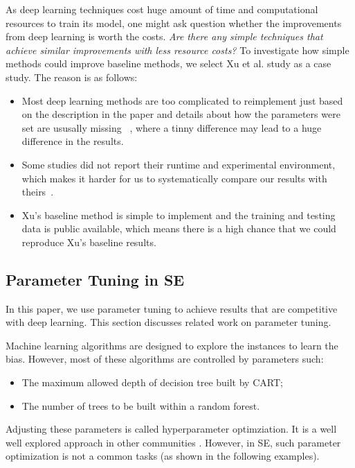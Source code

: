 \documentclass[sigconf,review, anonymous]{acmart}
\theoremstyle{break}
\newcommand{\bi}{\begin{itemize}[leftmargin=0.4cm]}
\newcommand{\ei}{\end{itemize}}
\begin{document}
As deep learning techniques cost huge amount of time and computational
resources to train its model,
one might ask question whether the improvements from deep learning is worth
the costs. {\it Are there any simple techniques that achieve similar improvements
with less resource costs?} To investigate how simple methods could improve baseline
methods, we select Xu et al.\cite{xu2016predicting} study as a case study. The reason
is as follows:
\bi 
\item Most deep learning methods are too complicated to reimplement just based on the description
in the paper and details about how the parameters were set are ususally missing ~\cite{white2016deep,white2015toward,lam2015combining,wang2016automatically,choetkiertikul2016deep,gu2016deep}, where a tinny difference may lead to a huge difference in the results.
\item Some studies did not report their runtime and experimental environment, which makes it harder for us
to systematically compare our results with theirs~\cite{choetkiertikul2016deep,yuan2014droid,white2015toward, white2016deep}.
\item Xu's baseline method is simple to implement and the training and testing data is public available, which means there is a high chance that we could reproduce Xu's baseline results. 
\ei 





\subsection{Parameter Tuning in SE}
In this paper, we use parameter tuning to
achieve results that are competitive with deep learning. This section
discusses related work on parameter tuning.


Machine learning algorithms are designed to explore the instances
to learn the bias. However, most of these algorithms are controlled by parameters
such:
\bi
\item
The maximum allowed depth
of decision tree built by CART;
\item
The number of trees to be built within a random forest.
\ei
Adjusting these parameters
is called hyperparameter optimziation.
It is a well   well explored approach in other communities \cite{bergstra2012random,li2016hyperband}. However, in SE,
such parameter optimization is not a common tasks (as shown in the following examples).
\end{document}
